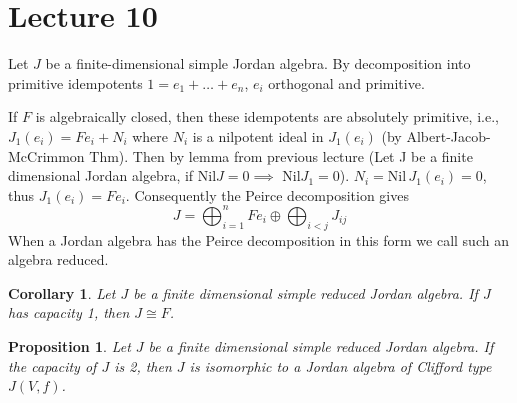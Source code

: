 \documentclass{article}
\newtheorem{proposition}[theorem]{Proposition}
\newtheorem{corollary}[theorem]{Corollary}
\begin{document}
\section{Lecture 10}

Let $J$ be a finite-dimensional simple Jordan algebra. By decomposition into primitive idempotents $1=e_1+\dots+e_n$, $e_i$ orthogonal and primitive. 

If $F$ is algebraically closed, then these idempotents are absolutely primitive, i.e., $J_1(e_i) = Fe_i + N_i$ where $N_i$ is a nilpotent ideal in $J_1(e_i)$ (by Albert-Jacob-McCrimmon Thm). Then by lemma from previous lecture (Let J be a finite dimensional Jordan algebra, if Nil$J=0 \implies$ Nil$J_1=0$). $N_i = \mathrm{Nil}\,J_1(e_i)=0$, thus $J_1(e_i) = Fe_i$. Consequently the Peirce decomposition gives  
\[ J = \bigoplus_{i=1}^n Fe_i \oplus \bigoplus_{i<j} J_{ij}  \]  
When a Jordan algebra has the Peirce decomposition in this form we call such an algebra reduced.  

\begin{corollary}  
Let $J$ be a finite dimensional simple reduced Jordan algebra. If $J$ has capacity 1, then $J \cong F$.  
\end{corollary}  

\begin{proposition}  
Let $J$ be a finite dimensional  simple reduced Jordan algebra. If the capacity of $J$ is 2, then $J$ is isomorphic to a Jordan algebra of Clifford type $J(V,f)$.  
\end{proposition} 
\end{document}
